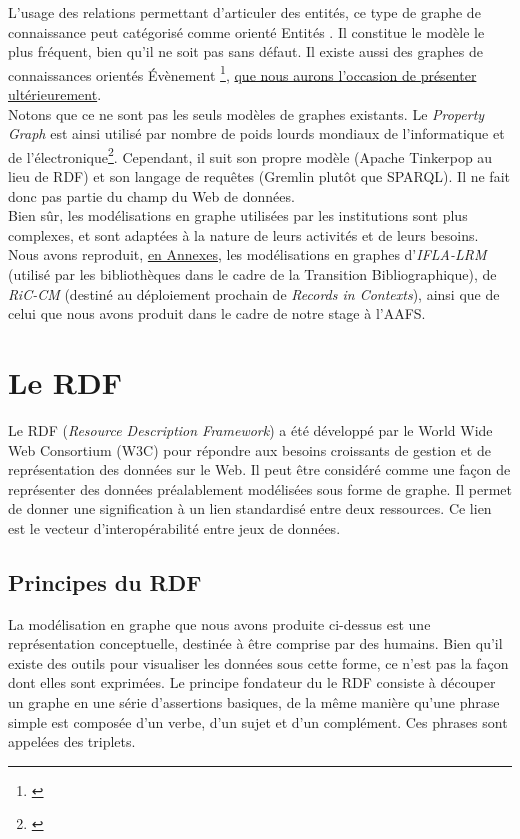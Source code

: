 \documentclass[a4paper,12pt,twoside]{book}
\begin{document}
L'usage des relations permettant d'articuler des entités, ce type de graphe de connaissance peut catégorisé comme \og orienté Entités \fg. Il constitue le modèle le plus fréquent, bien qu'il ne soit pas sans défaut. Il existe aussi des graphes de connaissances \og orientés Évènement \fg\footnote{\cite{poupeauQuelEvenementOu2010}}, \hyperref[mod-evenement]{que nous aurons l'occasion de présenter ultérieurement}.\\

Notons que ce ne sont pas les seuls modèles de graphes existants. Le \textit{Property Graph} est ainsi utilisé par nombre de poids lourds mondiaux de l'informatique et de l'électronique\footnote{\cite{poupeauAudelaLimitesQue2018}}. Cependant, il suit son propre modèle (Apache Tinkerpop au lieu de RDF) et son langage de requêtes (Gremlin plutôt que SPARQL). Il ne fait donc pas partie du champ du Web de données.\\

Bien sûr, les modélisations en graphe utilisées par les institutions sont plus complexes, et sont adaptées à la nature de leurs activités et de leurs besoins. Nous avons reproduit, \hyperref[annexe-modconcept]{en Annexes}, les modélisations en graphes d'\textit{IFLA-LRM} (utilisé par les bibliothèques dans le cadre de la \og Transition Bibliographique\fg), de \textit{RiC-CM} (destiné au déploiement prochain de \textit{Records in Contexts}), ainsi que de celui que nous avons produit dans le cadre de notre stage à l'AAFS.\\




\section{Le RDF}
Le RDF (\textit{Resource Description Framework}) a été développé par le World Wide Web Consortium (W3C) pour répondre aux besoins croissants de gestion et de représentation des données sur le Web. Il peut être considéré comme une façon de représenter des données préalablement modélisées sous forme de graphe. Il permet de donner une signification à un lien standardisé entre deux ressources. Ce lien est le vecteur d'interopérabilité entre jeux de données.\\


\subsection{Principes du RDF}
La modélisation en graphe que nous avons produite ci-dessus est une représentation conceptuelle, destinée à être comprise par des humains. Bien qu'il existe des outils pour visualiser les données sous cette forme, ce n'est pas la façon dont elles sont exprimées. Le principe fondateur du le RDF consiste à \og découper \fg{} un graphe en une série d'assertions basiques, de la même manière qu'une phrase simple est composée d'un verbe, d'un sujet et d'un complément. Ces phrases sont appelées des triplets.\\
\end{document}
